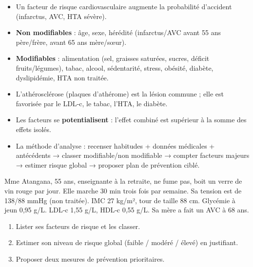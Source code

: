 \documentclass[11pt]{article}
\newcounter{popsec}
\newcounter{popsub}
\newcommand{\courssub}[1]{%
  \stepcounter{popsub}%
  \par\vspace{9pt}\noindent{\popxbold\fontsize{11.5}{13}\selectfont\color{popink}{\color{poporange}\thepopsec.\thepopsub}\hspace{6pt}#1}\par\nopagebreak\vspace{4pt}
}
\begin{document}
\courssub{Synthèse des points clés}
\begin{aretenir}
\begin{itemize}
  \item Un facteur de risque cardiovasculaire augmente la probabilité d'accident (infarctus, AVC, HTA sévère).
  \item \textbf{Non modifiables} : âge, sexe, hérédité (infarctus/AVC avant 55 ans père/frère, avant 65 ans mère/sœur).
  \item \textbf{Modifiables} : alimentation (sel, graisses saturées, sucres, déficit fruits/légumes), tabac, alcool, sédentarité, stress, obésité, diabète, dyslipidémie, HTA non traitée.
  \item L'athérosclérose (plaques d'athérome) est la lésion commune ; elle est favorisée par le LDL‑c, le tabac, l'HTA, le diabète.
  \item Les facteurs se \textbf{potentialisent} : l'effet combiné est supérieur à la somme des effets isolés.
  \item La méthode d'analyse : recenser habitudes + données médicales + antécédents → classer modifiable/non modifiable → compter facteurs majeurs → estimer risque global → proposer plan de prévention ciblé.
\end{itemize}
\end{aretenir}

\begin{exercice}
Mme Atangana, 55 ans, enseignante à la retraite, ne fume pas, boit un verre de vin rouge par jour. Elle marche 30 min trois fois par semaine. Sa tension est de 138/88 mmHg (non traitée). IMC 27 kg/m², tour de taille 88 cm. Glycémie à jeun 0,95 g/L. LDL‑c 1,55 g/L, HDL‑c 0,55 g/L. Sa mère a fait un AVC à 68 ans.
\begin{enumerate}
  \item Lister ses facteurs de risque et les classer.
  \item Estimer son niveau de risque global (faible / modéré / élevé) en justifiant.
  \item Proposer deux mesures de prévention prioritaires.
\end{enumerate}
\end{exercice}
\end{document}
